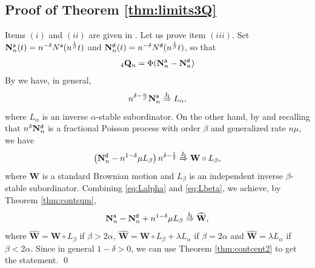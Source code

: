 \documentclass[]{amsart}
\numberwithin{equation}{section}
\theoremstyle{remark}
\theoremstyle{definition}
\begin{document}
\subsection{Proof of Theorem \ref{thm:limits3Q}}
Items $(i)$ and $(ii)$ are given in \cite[Theorem 3.3]{butt2023queuing}. Let us prove item $(iii)$. Set $\mathbf{N}^{\sf a}_n(t)=n^{-\delta}N^{\sf a}(n^{\frac{1}{\beta}}t)$ and $\mathbf{N}^{\sf d}_n(t)=n^{-\delta}N^{\sf d}(n^{\frac{1}{\beta}}t)$, so that
\begin{equation*}
	{}_4\mathbf{Q}_n=\Phi(\mathbf{N}^{\sf a}_n-\mathbf{N}^{\sf d}_n)
\end{equation*}
By \cite[Theorem 1]{leonenko2019limit} we have, in general,
\begin{equation}\label{eq:Lalpha}
	n^{\delta-\frac{\alpha}{\beta}}\mathbf{N}^{\sf a}_n \overset{\sf J_1}{\Rightarrow} L_\alpha,
\end{equation}
where $L_\alpha$ is an inverse $\alpha$-stable subordinator. On the other hand, by \cite[Proposition 6]{leonenko2019limit} and recalling that $n^{\delta}\mathbf{N}_n^{\sf d}$ is a fractional Poisson process with order $\beta$ and generalized rate $n\mu$, we have
\begin{equation}\label{eq:Lbeta}
	\left(\mathbf{N}_n^{\sf d}-n^{1-\delta}\mu L_\beta\right)n^{\delta-\frac{1}{2}} \overset{\sf J_1}{\Rightarrow} \mathbf{W} \circ L_\beta,
\end{equation}
where $\mathbf{W}$ is a standard Brownian motion and $L_\beta$ is an independent inverse $\beta$-stable subordinator. Combining \eqref{eq:Lalpha} and \eqref{eq:Lbeta}, we achieve, by Theorem \ref{thm:contsum},
\begin{equation*}
	\mathbf{N}_n^{\sf a}-\mathbf{N}_n^{\sf d}+n^{1-\delta}\mu L_\beta \overset{\sf J_1}{\Rightarrow} \widehat{\mathbf{W}},
\end{equation*}
where $\widehat{\mathbf{W}}=\mathbf{W}\circ L_\beta$ if $\beta>2\alpha$, $\widehat{\mathbf{W}}=\mathbf{W}\circ L_\beta+\lambda L_\alpha$ if $\beta=2\alpha$ and $\widehat{\mathbf{W}}=\lambda L_\alpha$ if $\beta<2\alpha$. Since in general $1-\delta>0$, we can use Theorem \ref{thm:contcent2} to get the statement.
%
%
%
%
%
%
%
%
%
%
%
%
%
%
\hfill \qed
\end{document}
